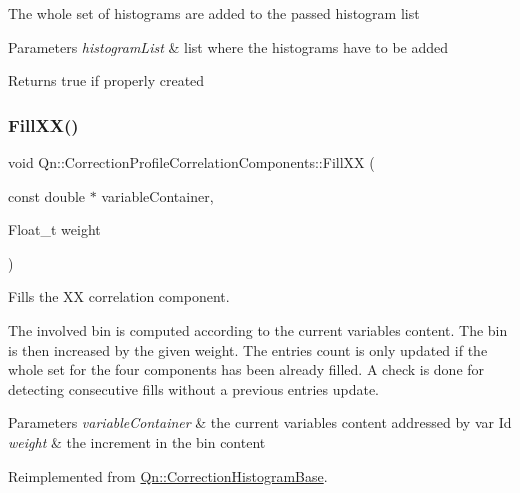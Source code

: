 The whole set of histograms are added to the passed histogram list


\begin{DoxyParams}{Parameters}
{\em histogram\+List} & list where the histograms have to be added \\
\hline
\end{DoxyParams}
\begin{DoxyReturn}{Returns}
true if properly created 
\end{DoxyReturn}
\mbox{\label{classQn_1_1CorrectionProfileCorrelationComponents_adebd3ce6b05ef6c65c1288132951ba22}} 
\subsubsection{\texorpdfstring{Fill\+X\+X()}{FillXX()}}
{\footnotesize\ttfamily void Qn\+::\+Correction\+Profile\+Correlation\+Components\+::\+Fill\+XX (\begin{DoxyParamCaption}\item[{const double $\ast$}]{variable\+Container,  }\item[{Float\+\_\+t}]{weight }\end{DoxyParamCaption})\hspace{0.3cm}{\ttfamily [virtual]}}

Fills the XX correlation component.

The involved bin is computed according to the current variables content. The bin is then increased by the given weight. The entries count is only updated if the whole set for the four components has been already filled. A check is done for detecting consecutive fills without a previous entries update.


\begin{DoxyParams}{Parameters}
{\em variable\+Container} & the current variables content addressed by var Id \\
\hline
{\em weight} & the increment in the bin content \\
\hline
\end{DoxyParams}


Reimplemented from \mbox{\hyperlink{classQn_1_1CorrectionHistogramBase_a42a813abe035719dddedf2102fbfbdc9}{Qn\+::\+Correction\+Histogram\+Base}}.

